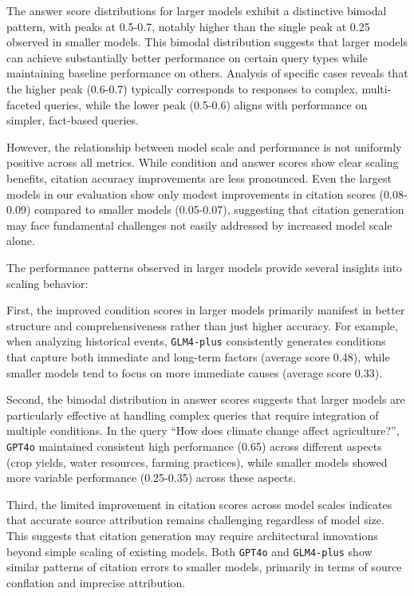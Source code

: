 The answer score distributions for larger models exhibit a distinctive bimodal pattern, with peaks at 0.5-0.7, notably higher than the single peak at 0.25 observed in smaller models. This bimodal distribution suggests that larger models can achieve substantially better performance on certain query types while maintaining baseline performance on others. Analysis of specific cases reveals that the higher peak (0.6-0.7) typically corresponds to responses to complex, multi-faceted queries, while the lower peak (0.5-0.6) aligns with performance on simpler, fact-based queries.

However, the relationship between model scale and performance is not uniformly positive across all metrics. While condition and answer scores show clear scaling benefits, citation accuracy improvements are less pronounced. Even the largest models in our evaluation show only modest improvements in citation scores (0.08-0.09) compared to smaller models (0.05-0.07), suggesting that citation generation may face fundamental challenges not easily addressed by increased model scale alone.

The performance patterns observed in larger models provide several insights into scaling behavior:

First, the improved condition scores in larger models primarily manifest in better structure and comprehensiveness rather than just higher accuracy. For example, when analyzing historical events, \texttt{GLM4-plus} consistently generates conditions that capture both immediate and long-term factors (average score 0.48), while smaller models tend to focus on more immediate causes (average score 0.33).

Second, the bimodal distribution in answer scores suggests that larger models are particularly effective at handling complex queries that require integration of multiple conditions. In the query ``How does climate change affect agriculture?'', \texttt{GPT4o} maintained consistent high performance (0.65) across different aspects (crop yields, water resources, farming practices), while smaller models showed more variable performance (0.25-0.35) across these aspects.

Third, the limited improvement in citation scores across model scales indicates that accurate source attribution remains challenging regardless of model size. This suggests that citation generation may require architectural innovations beyond simple scaling of existing models. Both \texttt{GPT4o} and \texttt{GLM4-plus} show similar patterns of citation errors to smaller models, primarily in terms of source conflation and imprecise attribution.

